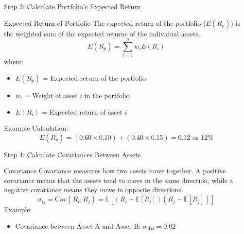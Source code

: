 \documentclass{beamer}
\begin{document}
\begin{frame}{Step 3: Calculate Portfolio's Expected Return}
  \begin{block}{Expected Return of Portfolio}
    The expected return of the portfolio (\(E(R_p)\)) is the weighted sum of the expected returns of the individual assets.
    \begin{equation*}
      E(R_p) = \sum_{i=1}^{n} w_i E(R_i)
    \end{equation*}
    where:
    \begin{itemize}
      \item \( E(R_p) \) = Expected return of the portfolio
      \item \( w_i \) = Weight of asset \( i \) in the portfolio
      \item \( E(R_i) \) = Expected return of asset \( i \)
    \end{itemize}
    Example Calculation:
    \begin{equation*}
      E(R_p) = (0.60 \times 0.10) + (0.40 \times 0.15) = 0.12 \text{ or 12\%}
    \end{equation*}
  \end{block}
\end{frame}

\begin{frame}{Step 4: Calculate Covariances Between Assets}
  \begin{block}{Covariance}
    Covariance measures how two assets move together. A positive covariance means that the assets tend to move in the same direction, while a negative covariance means they move in opposite directions.
    \begin{equation*}
      \sigma_{ij} = \text{Cov}(R_i, R_j) = \mathbb{E}[(R_i - \mathbb{E}[R_i])(R_j - \mathbb{E}[R_j])]
    \end{equation*}
    Example:
    \begin{itemize}
      \item Covariance between Asset A and Asset B: \(\sigma_{AB} = 0.02\)
    \end{itemize}
  \end{block}
\end{frame}
\end{document}
